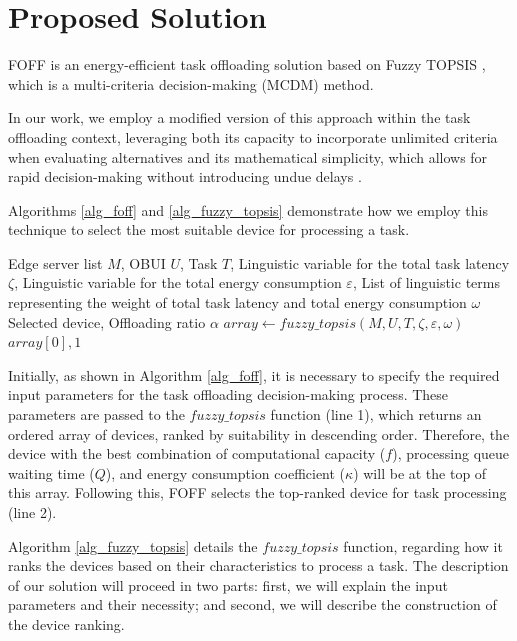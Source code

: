 \documentclass[iicol]{sn-jnl}
\begin{document}
\section{Proposed Solution}\label{sec_fuzzy_topsis}
FOFF is an energy-efficient task offloading solution based on Fuzzy TOPSIS \cite{CHEN20001}, which is a multi-criteria decision-making (MCDM) method. 

In our work, we employ a modified version of this approach within the task offloading context, leveraging both its capacity to incorporate unlimited criteria when evaluating alternatives and its mathematical simplicity, which allows for rapid decision-making without introducing undue delays \cite{kahraman2008fuzzy}.

Algorithms \ref{alg_foff} and \ref{alg_fuzzy_topsis} demonstrate how we employ this technique to select the most suitable device for processing a task.

\begin{algorithm}
    \caption{Fuzzy Offloading (FOFF)}\label{alg_foff}
    \begin{algorithmic}[1]
        \Require Edge server list $M$, OBUI $U$, Task $T$, Linguistic variable for the total task latency $\zeta$, Linguistic variable for the total energy consumption $\varepsilon$, List of linguistic terms representing the weight of total task latency and total energy consumption $\omega$    \Ensure Selected device, Offloading ratio $\alpha$
    \State $array \gets fuzzy\_topsis(M, U, T, \zeta, \varepsilon, \omega)$
    \State \Return $array[0], 1$
    \end{algorithmic}
\end{algorithm}

Initially, as shown in Algorithm \ref{alg_foff}, it is necessary to specify the required input parameters for the task offloading decision-making process. These parameters are passed to the $fuzzy\_topsis$ function (line 1), which returns an ordered array of devices, ranked by suitability in descending order. Therefore, the device with the best combination of computational capacity ($f$), processing queue waiting time ($Q$), and energy consumption coefficient ($\kappa$) will be at the top of this array. Following this, FOFF selects the top-ranked device for task processing (line 2).

Algorithm \ref{alg_fuzzy_topsis} details the $fuzzy\_topsis$ function, regarding how it ranks the devices based on their characteristics to process a task. The description of our solution will proceed in two parts: first, we will explain the input parameters and their necessity; and second, we will describe the construction of the device ranking.
\end{document}
